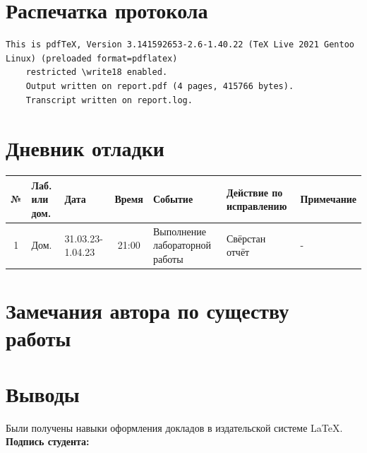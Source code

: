 \documentclass[12pt, letterpaper]{article}
\begin{document}
\section{Распечатка протокола}
\begin{lstlisting}[breaklines]
    This is pdfTeX, Version 3.141592653-2.6-1.40.22 (TeX Live 2021 Gentoo Linux) (preloaded format=pdflatex)
    restricted \write18 enabled.
    Output written on report.pdf (4 pages, 415766 bytes).
    Transcript written on report.log.
\end{lstlisting}  
\section{Дневник отладки}
\begin{tabular}{|c|p{1cm}|p{1.5cm}|c|p{2.5cm}|p{2cm}|p{2.25cm}|}
    \hline
    № & Лаб. или дом. & Дата & Время & Событие & Действие по исправлению & Примечание\\
    \hline
    1 & Дом. & 31.03.23-1.04.23 & 21:00 & Выполнение лабораторной работы & Свёрстан отчёт & -\\
    \hline
\end{tabular}
\section{Замечания автора по существу работы}


\section{Выводы}
Были получены навыки оформления докладов в издательской системе \LaTeX{}. \\
\flushright \textbf{Подпись студента:} \underline{\hspace{3cm}}
\end{document}

